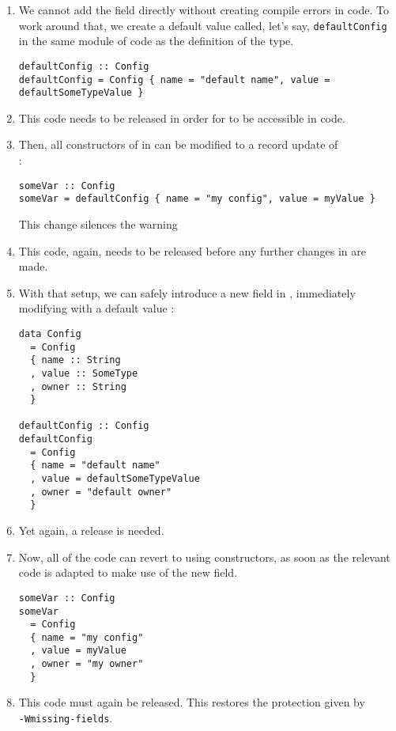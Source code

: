 \documentclass[en]{pracamgr}
\begin{document}
\begin{enumerate}
  \item We cannot add the field directly without creating compile errors in \user{} code. 
  To work around that, we create a default value called, let's say, \texttt{defaultConfig} in the same module of \infra{} code as 
  the definition of the type.\\
  \begin{minipage}{\linewidth}
    \begin{lstlisting}
defaultConfig :: Config
defaultConfig = Config { name = "default name", value = defaultSomeTypeValue }
    \end{lstlisting}
  \end{minipage}
  \item This code needs to be released in order for  to be accessible in \user{} code.
  \item Then, all constructors of \conf{} in \user{} can be modified to a record update of \\
  :\\
  \begin{minipage}{\linewidth}
    \begin{lstlisting}
someVar :: Config
someVar = defaultConfig { name = "my config", value = myValue }
    \end{lstlisting}
  \end{minipage}
  This change silences the warning 
  \item This code, again, needs to be released before any further changes in \infra{} are made.
  \item With that setup, we can safely introduce a new field in \infra{}, immediately modifying  with a default value :\\
  \begin{minipage}{\linewidth}
    \begin{lstlisting}
data Config 
  = Config
  { name :: String
  , value :: SomeType
  , owner :: String
  }

defaultConfig :: Config
defaultConfig 
  = Config 
  { name = "default name"
  , value = defaultSomeTypeValue
  , owner = "default owner" 
  }
    \end{lstlisting}
    \end{minipage}
  \item Yet again, a release is needed.
  \item Now, all of the \user{} code can revert to using constructors, as soon as the relevant code is adapted to make use of the 
  new field. \\
\begin{minipage}{\linewidth}
\begin{lstlisting}
someVar :: Config
someVar 
  = Config
  { name = "my config"
  , value = myValue
  , owner = "my owner"
  }
\end{lstlisting}
\end{minipage}

  \item This \user{} code must again be released. This restores the protection given by \\
  \texttt{-Wmissing-fields}.
\end{enumerate}
\end{document}
